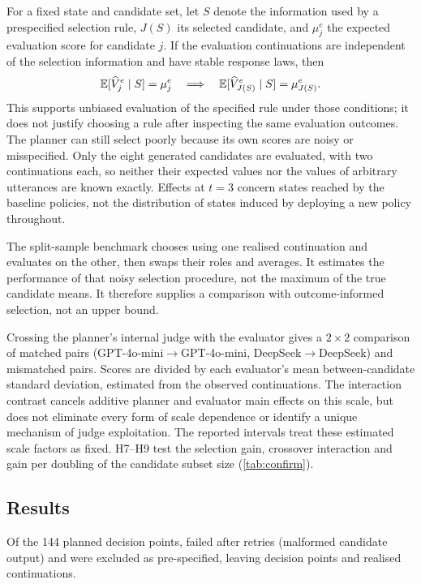 For a fixed state and candidate set, let $S$ denote the information used by a prespecified selection rule,
$J(S)$ its selected candidate, and $\mu_j^e$ the expected evaluation score for candidate $j$. If the evaluation
continuations are independent of the selection information and have stable response laws, then
\begin{equation}
\mathbb{E}[\widehat V_j^e\mid S]=\mu_j^e
\quad\Longrightarrow\quad
\mathbb{E}[\widehat V_{J(S)}^e\mid S]=\mu_{J(S)}^e.
\end{equation}
This supports unbiased evaluation of the specified rule under those conditions; it does not justify choosing a
rule after inspecting the same evaluation outcomes. The planner can still select poorly because its own scores
are noisy or misspecified. Only the eight generated candidates are evaluated, with two continuations each, so
neither their expected values nor the values of arbitrary utterances are known exactly. Effects at $t=3$ concern
states reached by the baseline policies, not the distribution of states induced by deploying a new policy throughout.

The split-sample benchmark chooses using one realised continuation and evaluates on the other, then swaps their
roles and averages. It estimates the performance of that noisy selection procedure, not the maximum of the true
candidate means. It therefore supplies a comparison with outcome-informed selection, not an upper bound.

Crossing the planner's internal judge with the evaluator gives a $2\times2$ comparison of matched pairs
(GPT-4o-mini$\to$GPT-4o-mini, DeepSeek$\to$DeepSeek) and mismatched pairs. Scores are divided by each evaluator's
mean between-candidate standard deviation, estimated from the observed continuations. The interaction contrast
cancels additive planner and evaluator main effects on this scale, but does not eliminate every form of
scale dependence or identify a unique mechanism of judge exploitation. The reported intervals treat these
estimated scale factors as fixed. H7--H9 test the selection gain, crossover interaction and gain per doubling of
the candidate subset size (\cref{tab:confirm}).

\subsection{Results}
Of the 144 planned decision points, \StwoNfail{} failed after retries (malformed candidate output) and were excluded as
pre-specified, leaving \StwoNpoints{} decision points and \StwoNcont{} realised continuations.

